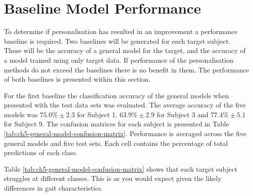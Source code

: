 \section{Baseline Model Performance}
\label{sec:personalisation-baseline-model-results}
To determine if personalisation has resulted in an improvement a performance baseline is required. Two baselines will be generated for each target subject. These will be the accuracy of a general model for the target, and the accuracy of a model trained using only target data. If performance of the personalisation methods do not exceed the baselines there is no benefit in them. The performance of both baselines is presented within this section.

For the first baseline the classification accuracy of the general models when presented with the test data sets was evaluated. The average accuracy of the five models was $75.0\%\pm2.3$ for Subject 1, $63.9\%\pm2.9$ for Subject 3 and $77.4\%\pm5.1$ for Subject 9. The confusion matrices for each subject is presented in Table \ref{tab:ch5-general-model-confusion-matrix}. Performance is averaged across the five general models and five test sets. Each cell contains the percentage of total predictions of each class.

Table \ref{tab:ch5-general-model-confusion-matrix} shows that each target subject struggles at different classes. This is as you would expect given the likely differences in gait characteristics.

